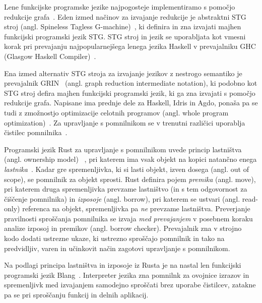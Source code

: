 \documentclass[a4paper, 12pt]{article}
\begin{document}
Lene funkcijske programske jezike najpogosteje implementiramo s pomočjo redukcije gra\-fa~\cite{peyton1987implementation}. Eden izmed načinov za izvajanje redukcije je abstraktni STG stroj (angl. Spineless Tagless G-machine)~\cite{jones1992implementing}, ki definira in zna izvajati majhen funkcijski programski jezik STG. STG stroj in jezik se uporabljata kot vmesni korak pri prevajanju najpopularnejšega lenega jezika Haskell v prevajalniku GHC (Glasgow Haskell Compiler)~\cite{GHC}.

Ena izmed alternativ STG stroja za izvajanje jezikov z nestrogo semantiko je  prevajalnik GRIN~\cite{boquist1997grin} (angl. graph reduction intermediate notation), ki podobno kot STG stroj defira majhen funkcijski programski jezik, ki ga zna izvajati s pomočjo redukcije grafa. Napisane ima prednje dele za Haskell, Idris in Agdo, ponaša pa se tudi z zmožnostjo optimizacije celotnih programov (angl. whole program optimization)~\cite{podlovics2022modern}. Za upravljanje s pomnilnikom se v trenutni različici uporablja čistilec pomnilnika~\cite{boquist1999code}.

Programski jezik Rust za upravljanje s pomnilnikom uvede princip lastništva (angl. ownership model) ~\cite{klabnik2023rust}, pri katerem ima vsak objekt na kopici natančno enega \textit{lastnika}~\cite{Jung, Oxide, StackedBorrows}. Kadar gre spremenljivka, ki si lasti objekt, izven dosega (angl. out of scope), se pomnilnik za objekt sprosti. Rust definira pojem \textit{premika} (angl. move), pri katerem druga spremenljivka prevzame lastništvo (in s tem odgovornost za čiščenje pomnilnika) in \textit{izposoje} (angl. borrow), pri katerem se ustvari (angl. read-only) referenca na objekt, spremenljivka pa \textit{ne} prevzame lastništva. Preverjanje pravilnosti sproščanja pomnilnika se izvaja \textit{med prevajanjem} v posebnem koraku analize izposoj in premikov (angl. borrow checker). Prevajalnik zna v strojno kodo dodati ustrezne ukaze, ki ustrezno sproščajo pomnilnik in tako na predvidljiv, varen in učinkovit način zagotovi upravljanje s pomnilnikom.

Na podlagi principa lastništva in izposoje iz Rusta je na nastal len funkcijski programski jezik Blang~\cite{Kocjan_Turk_2022}. Interpreter jezika zna pomnilnk za ovojnice izrazov in spremenljivk med izvajanjem samodejno sproščati brez uporabe čistilcev, zatakne pa se pri sproščanju funkcij in delnih aplikacij.


\end{document}
